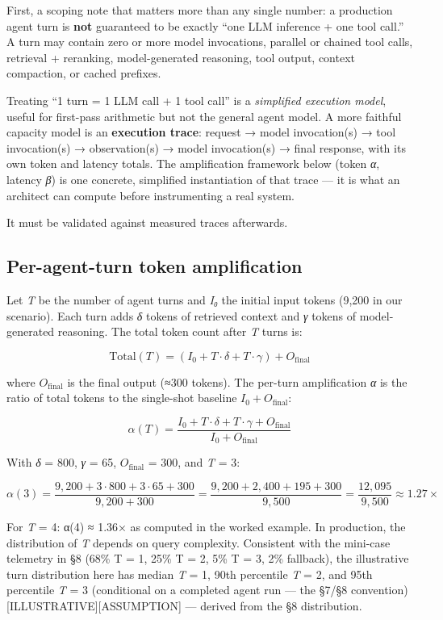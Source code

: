 First, a scoping note that matters more than any single number: a
production agent turn is \textbf{not} guaranteed to be exactly ``one LLM
inference + one tool call.'' A turn may contain zero or more model
invocations, parallel or chained tool calls, retrieval + reranking,
model-generated reasoning, tool output, context compaction, or cached
prefixes.

Treating ``1 turn = 1 LLM call + 1 tool call'' is a \emph{simplified
execution model}, useful for first-pass arithmetic but not the general
agent model. A more faithful capacity model is an \textbf{execution
trace}: request → model invocation(s) → tool invocation(s) →
observation(s) → model invocation(s) → final response, with its own
token and latency totals. The amplification framework below (token
\emph{α}, latency \emph{β}) is one concrete, simplified instantiation of
that trace --- it is what an architect can compute before instrumenting
a real system.

It must be validated against measured traces afterwards.

\subsection{Per-agent-turn token
amplification}\label{per-agent-turn-token-amplification}

Let \emph{T} be the number of agent turns and \emph{I₀} the initial
input tokens (9,200 in our scenario). Each turn adds \emph{δ} tokens of
retrieved context and \emph{γ} tokens of model-generated reasoning. The
total token count after \emph{T} turns is:

\[
\text{Total}(T) = (I_0 + T \cdot \delta + T \cdot \gamma) + O_\text{final}
\]

where \(O_\text{final}\) is the final output (≈300 tokens). The per-turn
amplification \emph{α} is the ratio of total tokens to the single-shot
baseline \(I_0 + O_\text{final}\):

\[
\alpha(T) = \frac{I_0 + T\cdot\delta + T\cdot\gamma + O_\text{final}}{I_0 + O_\text{final}}
\]

With \emph{δ} = 800, \emph{γ} = 65, \(O_\text{final}\) = 300, and
\emph{T} = 3:

\[
\alpha(3) = \frac{9{,}200 + 3\cdot800 + 3\cdot65 + 300}{9{,}200 + 300} = \frac{9{,}200 + 2{,}400 + 195 + 300}{9{,}500} = \frac{12{,}095}{9{,}500} \approx 1.27\times
\]

For \emph{T} = 4: α(4) ≈ 1.36× as computed in the worked example. In
production, the distribution of \emph{T} depends on query complexity.
Consistent with the mini-case telemetry in §8 (68\% T = 1, 25\% T = 2,
5\% T = 3, 2\% fallback), the illustrative turn distribution here has
median \emph{T} = 1, 90th percentile \emph{T} = 2, and 95th percentile
\emph{T} = 3 (conditional on a completed agent run --- the §7/§8
convention) \mbox{{[}ILLUSTRATIVE{]}}\hspace{0pt}\mbox{{[}ASSUMPTION{]}} --- derived from the §8
distribution.

